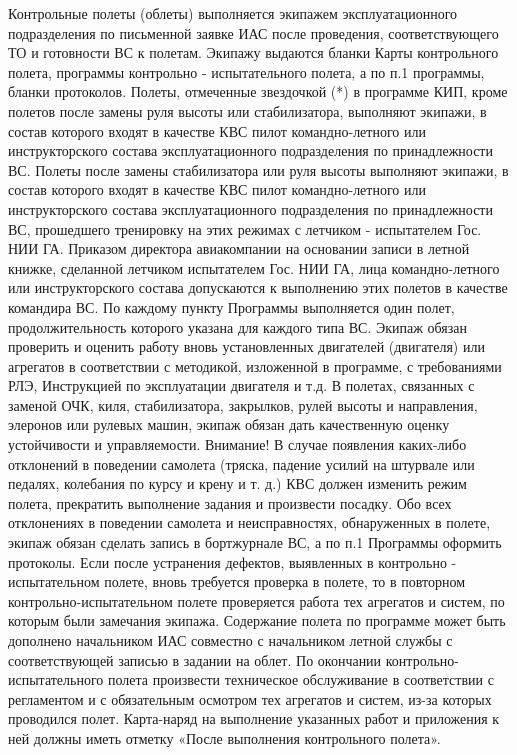 Контрольные полеты (облеты) выполняется экипажем эксплуатационного подразделения по письменной заявке ИАС после проведения, соответствующего ТО и готовности ВС к полетам. Экипажу выдаются бланки Карты контрольного полета, программы контрольно - испытательного полета, а по п.1 программы, бланки протоколов.
Полеты, отмеченные звездочкой (*) в программе КИП, кроме полетов после замены руля высоты или стабилизатора, выполняют экипажи, в состав которого входят в качестве КВС пилот командно-летного или инструкторского состава эксплуатационного подразделения по принадлежности ВС.
Полеты после замены стабилизатора или руля высоты выполняют экипажи, в состав которого входят в качестве КВС пилот командно-летного или инструкторского состава эксплуатационного подразделения по принадлежности ВС, прошедшего тренировку на этих режимах с летчиком - испытателем Гос. НИИ ГА.
Приказом директора авиакомпании на основании записи в летной книжке, сделанной летчиком испытателем Гос. НИИ ГА, лица командно-летного или инструкторского состава допускаются к выполнению этих полетов в качестве командира ВС.
По каждому пункту Программы выполняется один полет, продолжительность которого указана для каждого типа ВС.
Экипаж обязан проверить и оценить работу вновь установленных двигателей (двигателя) или агрегатов в соответствии с методикой, изложенной в программе, с требованиями РЛЭ, Инструкцией по эксплуатации двигателя и т.д.
В полетах, связанных с заменой ОЧК, киля, стабилизатора, закрылков, рулей высоты и направления, элеронов или рулевых машин, экипаж обязан дать качественную оценку устойчивости и управляемости.
Внимание! В случае появления каких-либо отклонений в поведении самолета (тряска, падение усилий на штурвале или педалях, колебания по курсу и крену и т. д.) КВС должен изменить режим полета, прекратить выполнение задания и произвести посадку.
Обо всех отклонениях в поведении самолета и неисправностях, обнаруженных в полете, экипаж обязан сделать запись в бортжурнале ВС, а по п.1 Программы оформить протоколы.
Если после устранения дефектов, выявленных в контрольно - испытательном полете, вновь требуется проверка в полете, то в повторном контрольно-испытательном полете проверяется работа тех агрегатов и систем, по которым были замечания экипажа.
Содержание полета по программе может быть дополнено начальником ИАС совместно с начальником летной службы с соответствующей записью в задании на облет.
По окончании контрольно-испытательного полета произвести техническое обслуживание в соответствии с регламентом и с обязательным осмотром тех агрегатов и систем, из-за которых проводился полет. Карта-наряд на выполнение указанных работ и приложения к ней должны иметь отметку «После выполнения контрольного полета».

